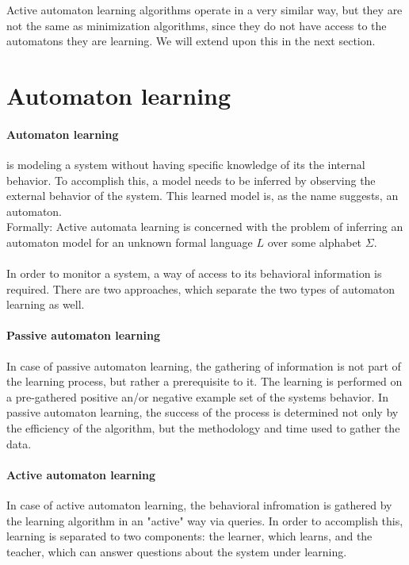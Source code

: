 Active automaton learning algorithms operate in a very similar way, but they are not the same as minimization algorithms, since they do not have access to the automatons they are learning. We will extend upon this in the next section.



\section{Automaton learning}



\paragraph{Automaton learning}  is modeling a system without having specific knowledge of its the internal behavior. To accomplish this, a model needs to be inferred by observing the external behavior of the system. This learned model is, as the name suggests, an automaton. 
\\Formally: Active  automata  learning is  concerned  with  the  problem  of  inferring  an automaton model for an unknown formal language $L$ over some alphabet $\Sigma$\cite{Howar2018}.
\\\\In order to monitor a system, a way of access to its behavioral information is required. There are two approaches, which separate the two types of automaton learning as well.

\paragraph{Passive automaton learning} In case of passive automaton learning, the gathering of information is not part of the learning process, but rather a prerequisite to it. The learning is performed on a pre-gathered positive an/or negative example set of the systems behavior. In passive automaton learning, the success of the process is determined not only by the efficiency of the algorithm, but the methodology and time used to gather the data.

\paragraph{Active automaton learning} In case of active automaton learning, the behavioral infromation is gathered by the learning algorithm in an "active" way via queries. In order to accomplish this, learning is separated to two components: the learner, which learns, and the teacher, which can answer questions about the system under learning.


